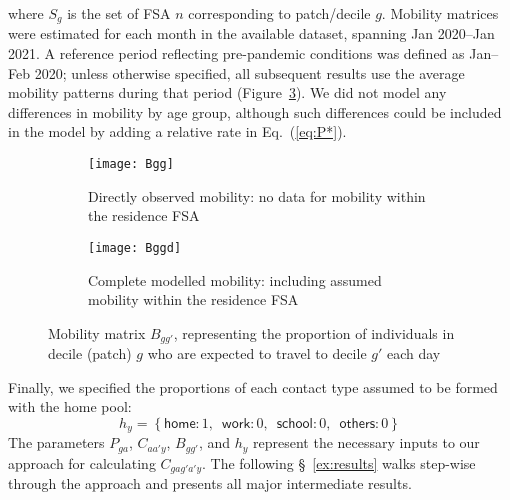 where $S_g$ is the set of FSA $n$ corresponding to patch/decile $g$.
Mobility matrices were estimated for each month in the available dataset,
spanning Jan 2020--Jan 2021.
A reference period reflecting pre-pandemic conditions was defined as Jan--Feb 2020;
unless otherwise specified, all subsequent results use the average mobility patterns during that period
(Figure~\ref{fig:Bgg}).
We did not model any differences in mobility by age group,
although such differences could be included in the model by adding a relative rate in Eq.~(\ref{eq:P*}).
\begin{figure}
  \centering
  \begin{subfigure}{0.49\linewidth}
    \texttt{[image: Bgg]}
    \caption{Directly observed mobility: no data for mobility within the residence FSA}
    \label{fig:Bggo}
  \end{subfigure}\hfill%
  \begin{subfigure}{0.49\linewidth}
    \texttt{[image: Bggd]}
    \caption{Complete modelled mobility: including assumed mobility within the residence FSA}
    \label{fig:Bggd}
  \end{subfigure}
  \caption{Mobility matrix $B_{gg'}$, representing
    the proportion of individuals in decile (patch) $g$ who are expected to travel to decile $g'$ each day}
  \label{fig:Bgg}
\end{figure}
\par
Finally, we specified the proportions of each contact type assumed to be formed with the home pool:
\begin{equation}
  h_y = \left\{
  \textsf{home}:   1,\enspace
  \textsf{work}:   0,\enspace
  \textsf{school}: 0,\enspace
  \textsf{others}: 0 \right\}  
\end{equation}
The parameters $P_{ga}$, $C_{aa'y}$, $B_{gg'}$, and $h_y$ represent
the necessary inputs to our approach for calculating $C_{gag'a'y}$.
The following \S~\ref{ex:results} walks step-wise through the approach
and presents all major intermediate results.
\clearpage %
